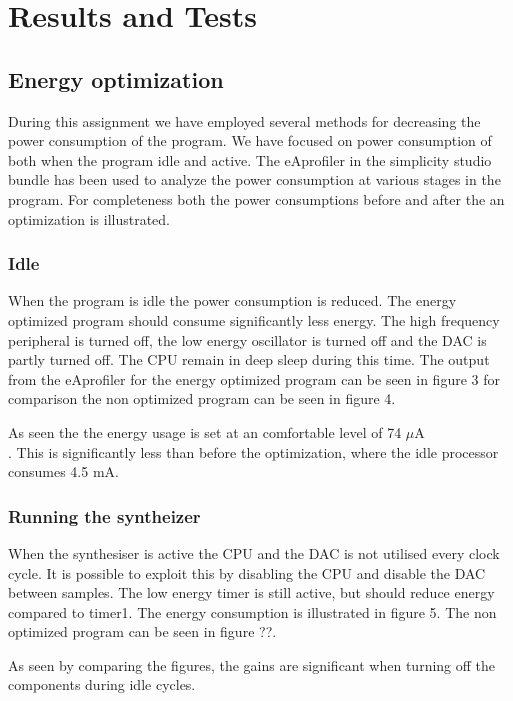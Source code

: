 \section{Results and Tests}

\subsection{Energy optimization}
During this assignment we have employed several methods for decreasing the power consumption of the program. We have focused on power consumption of both when the program idle and active. The eAprofiler in the simplicity studio bundle has been used to analyze the power consumption at various stages in the program. For completeness both the power consumptions before and after the an optimization is illustrated.


\subsubsection{Idle}
When the program is idle the power consumption is reduced. The energy optimized program should consume   significantly less energy. The high frequency peripheral is turned off, the low energy oscillator is turned off and the DAC is partly turned off. The CPU remain in deep sleep during this time. The output from the eAprofiler for the energy optimized program can be seen in figure 3 for comparison the non optimized program can be seen in figure 4. 





As seen the the energy usage is set at an comfortable level of 74 $\mu$A \\. This is significantly less than before the optimization, where the idle processor consumes 4.5 mA. 

\subsubsection{Running the syntheizer}
When the synthesiser is active the CPU and the DAC is not utilised every clock cycle. It is possible to exploit this by disabling the CPU and disable the DAC between samples. The low energy timer is still active, but should reduce energy compared to timer1. The energy consumption is illustrated in figure 5. The non optimized program can be seen in figure ??.    




As seen by comparing the figures, the gains are significant when turning off the components during idle cycles. 


